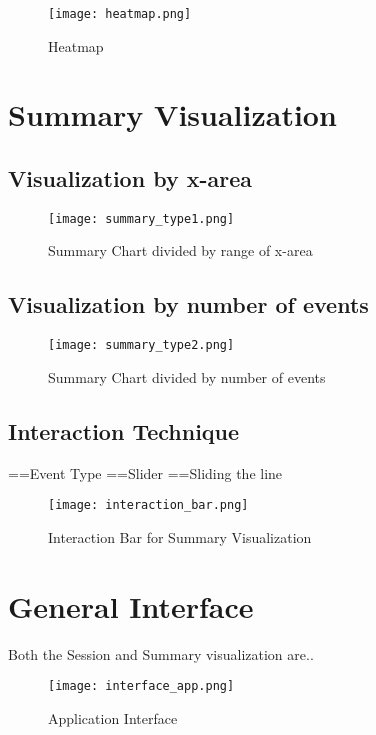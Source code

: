 \begin{figure}
\centering
\texttt{[image: heatmap.png]}
\caption{Heatmap}
\end{figure}


\section{Summary Visualization}
\subsection{Visualization by x-area}
\begin{figure}
\centering
\texttt{[image: summary\_type1.png]}
\caption{Summary Chart divided by range of x-area}
\end{figure}

\subsection{Visualization by number of events}
\begin{figure}
\centering
\texttt{[image: summary\_type2.png]}
\caption{Summary Chart divided by number of events}
\end{figure}

\subsection{Interaction Technique}
==Event Type
==Slider
==Sliding the line
\begin{figure}
\centering
\texttt{[image: interaction\_bar.png]}
\caption{Interaction Bar for Summary Visualization}
\end{figure}
\section{General Interface}
Both the Session and Summary visualization are..
\begin{figure}
\centering
\texttt{[image: interface\_app.png]}
\caption{Application Interface}
\end{figure}